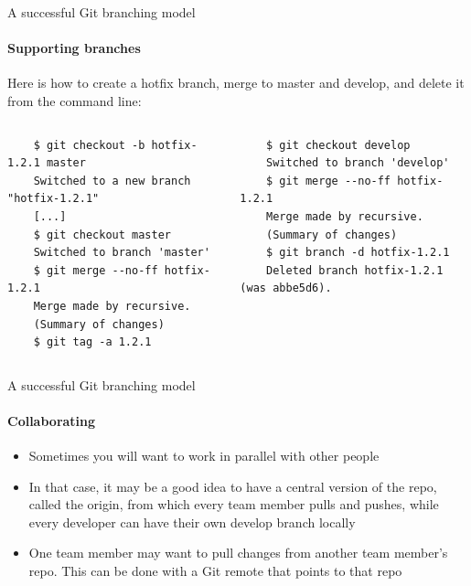 \documentclass[10pt, aspectratio=169, xcolor=dvipsnames]{beamer}
\let\olditem\item
\renewcommand{\item}{%
\olditem\vspace{0.3em}}
\begin{document}
\begin{frame}[fragile, t]{A successful Git branching model}
    \framesubtitle{Supporting branches}

    \normalsize\vspace{0.5em} Here is how to create a \alert{hotfix} branch, merge to \alert{master} and \alert{develop}, and delete it from the command line:
    
    \vspace{-0.5em}
    \begin{columns}
        \begin{column}[t]{0.5\textwidth}
            \begin{verbatim}
    $ git checkout -b hotfix-1.2.1 master
    Switched to a new branch "hotfix-1.2.1"
    [...]
    $ git checkout master
    Switched to branch 'master'
    $ git merge --no-ff hotfix-1.2.1
    Merge made by recursive.
    (Summary of changes)
    $ git tag -a 1.2.1
        \end{verbatim}   
        \end{column}

        \begin{column}[t]{0.5\textwidth}
            \begin{verbatim}
    $ git checkout develop
    Switched to branch 'develop'
    $ git merge --no-ff hotfix-1.2.1
    Merge made by recursive.
    (Summary of changes)
    $ git branch -d hotfix-1.2.1
    Deleted branch hotfix-1.2.1 (was abbe5d6).
        \end{verbatim}  
        \end{column}
    \end{columns} 
\end{frame}

\begin{frame}[t]{A successful Git branching model}
    \framesubtitle{Collaborating}

    \normalsize\vspace{0.5em}
    \begin{itemize}
        \item Sometimes you will want to work in parallel with other people
        \item In that case, it may be a good idea to have a central version of the repo, called the \alert{origin}, from which every team member pulls and pushes, while every developer can have their own \alert{develop} branch locally
        \item One team member may want to pull changes from another team member's repo. This can be done with a Git remote that points to that repo
    \end{itemize}
\end{frame}
\end{document}
